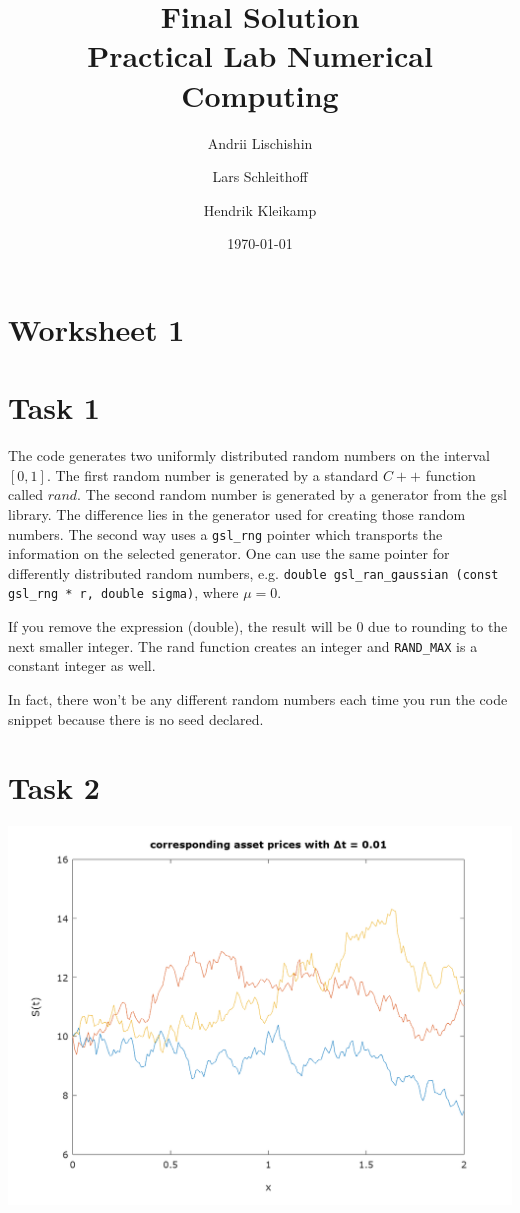 \documentclass[10pt,a4paper]{article}
\begin{document}
\title{Final Solution\\
\small{Practical Lab Numerical Computing}}
\author{Andrii Lischishin \and Lars Schleithoff \and Hendrik Kleikamp}
\date{\today}
\maketitle

\section*{Worksheet 1}

\section*{Task 1}

The code generates two uniformly distributed random numbers on the interval $[0,1]$. The first random number is generated by a standard $C++$ function called $rand$.
The second random number is generated by a generator from the gsl library.
The difference lies in the generator used for creating those random numbers. The second way uses a \texttt{gsl\_rng} pointer which transports the information on the selected generator. 
One can use the same pointer for differently distributed random numbers, e.g. \texttt{double gsl\_ran\_gaussian (const gsl\_rng * r, double sigma)}, where $\mu=0$. 

If you remove the expression (double), the result will be $0$ due to rounding to the next smaller integer. The rand function creates an integer and \texttt{RAND\_MAX} is a constant integer as well. 

In fact, there won't be any different random numbers each time you run the code snippet because there is no seed declared. 

\section*{Task 2}

\begin{center}
\includegraphics[scale=0.45]{asset_001.jpeg}		
\end{center}	
\end{document}
